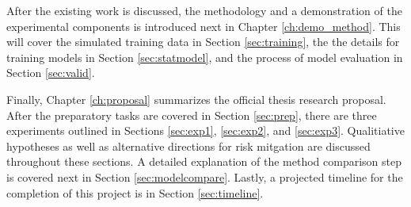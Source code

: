 After the existing work is discussed, the methodology and a demonstration of
the experimental components is introduced next in Chapter \ref{ch:demo_method}.
This will cover the simulated training data in Section \ref{sec:training}, the
the details for training models in Section \ref{sec:statmodel}, and the
process of model evaluation in Section \ref{sec:valid}.  

Finally, Chapter \ref{ch:proposal} summarizes the official thesis research
proposal. After the preparatory tasks are covered in Section \ref{sec:prep},
there are three experiments outlined in Sections \ref{sec:exp1},
\ref{sec:exp2}, and \ref{sec:exp3}. Qualitiative hypotheses as well as
alternative directions for risk mitgation are discussed throughout these
sections.  A detailed explanation of the method comparison step is covered next
in Section \ref{sec:modelcompare}.  Lastly, a projected timeline for the
completion of this project is in Section \ref{sec:timeline}.
